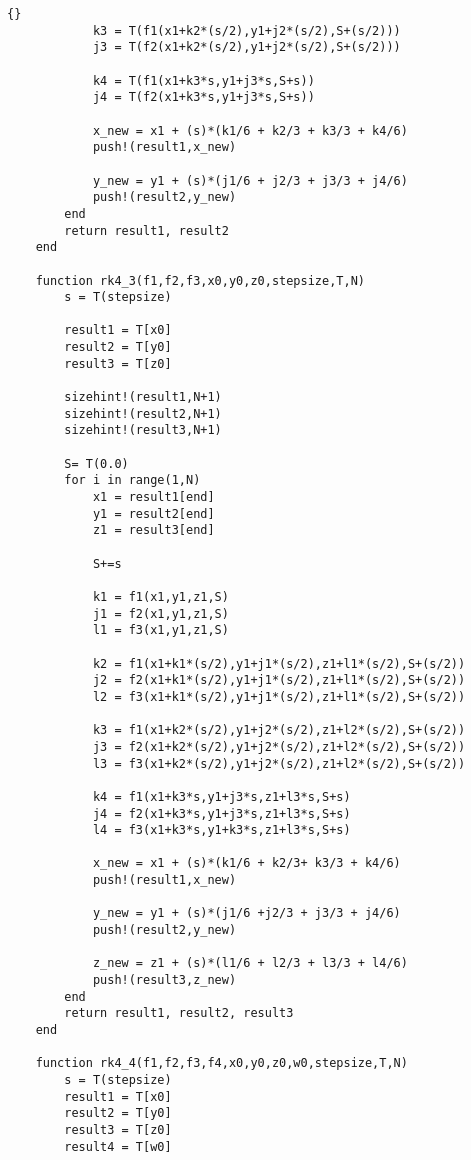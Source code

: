 \begin{lstlisting}[caption =\text{numerical\_scheme.jl}, label = a]{}
            k3 = T(f1(x1+k2*(s/2),y1+j2*(s/2),S+(s/2)))
            j3 = T(f2(x1+k2*(s/2),y1+j2*(s/2),S+(s/2)))

            k4 = T(f1(x1+k3*s,y1+j3*s,S+s))
            j4 = T(f2(x1+k3*s,y1+j3*s,S+s))

            x_new = x1 + (s)*(k1/6 + k2/3 + k3/3 + k4/6)
            push!(result1,x_new)

            y_new = y1 + (s)*(j1/6 + j2/3 + j3/3 + j4/6)
            push!(result2,y_new)
        end
        return result1, result2
    end

    function rk4_3(f1,f2,f3,x0,y0,z0,stepsize,T,N)
        s = T(stepsize)

        result1 = T[x0]
        result2 = T[y0]
        result3 = T[z0]

        sizehint!(result1,N+1)
        sizehint!(result2,N+1)
        sizehint!(result3,N+1)

        S= T(0.0)
        for i in range(1,N)
            x1 = result1[end]
            y1 = result2[end]
            z1 = result3[end]

            S+=s

            k1 = f1(x1,y1,z1,S)
            j1 = f2(x1,y1,z1,S)
            l1 = f3(x1,y1,z1,S)

            k2 = f1(x1+k1*(s/2),y1+j1*(s/2),z1+l1*(s/2),S+(s/2))
            j2 = f2(x1+k1*(s/2),y1+j1*(s/2),z1+l1*(s/2),S+(s/2))
            l2 = f3(x1+k1*(s/2),y1+j1*(s/2),z1+l1*(s/2),S+(s/2))

            k3 = f1(x1+k2*(s/2),y1+j2*(s/2),z1+l2*(s/2),S+(s/2))
            j3 = f2(x1+k2*(s/2),y1+j2*(s/2),z1+l2*(s/2),S+(s/2))
            l3 = f3(x1+k2*(s/2),y1+j2*(s/2),z1+l2*(s/2),S+(s/2))

            k4 = f1(x1+k3*s,y1+j3*s,z1+l3*s,S+s)
            j4 = f2(x1+k3*s,y1+j3*s,z1+l3*s,S+s)
            l4 = f3(x1+k3*s,y1+k3*s,z1+l3*s,S+s)

            x_new = x1 + (s)*(k1/6 + k2/3+ k3/3 + k4/6)
            push!(result1,x_new)

            y_new = y1 + (s)*(j1/6 +j2/3 + j3/3 + j4/6)
            push!(result2,y_new)

            z_new = z1 + (s)*(l1/6 + l2/3 + l3/3 + l4/6)
            push!(result3,z_new)
        end
        return result1, result2, result3
    end

    function rk4_4(f1,f2,f3,f4,x0,y0,z0,w0,stepsize,T,N)
        s = T(stepsize)
        result1 = T[x0]       
        result2 = T[y0]
        result3 = T[z0]
        result4 = T[w0]


\end{lstlisting}
